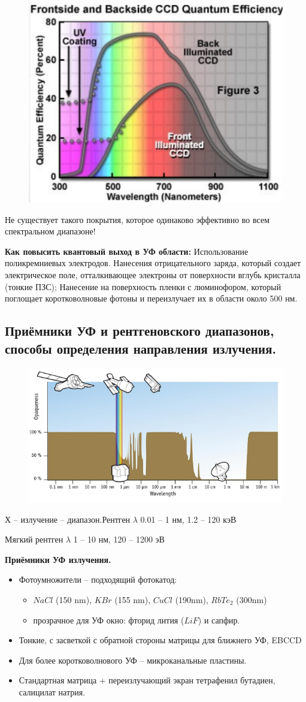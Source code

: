 \documentclass[12pt]{article}
\begin{document}
\begin{figure}[h]
	\centering
	\includegraphics[width=0.3\linewidth]{"Снимок экрана от 2024-12-23 20-03-43"}
\end{figure}
Не существует такого покрытия, которое одинаково
эффективно во всем спектральном диапазоне!

\textbf{Как повысить квантовый выход в УФ области:}
Использование поликремниевых электродов.
Нанесения отрицательного заряда, который создает
электрическое поле, отталкивающее электроны от
поверхности вглубь кристалла (тонкие ПЗС);
Нанесение на поверхность пленки с люминофором,
который поглощает коротковолновые фотоны и
переизлучает их в области около 500 нм.
\subsection{Приёмники УФ и рентгеновского диапазонов, способы определения направления излучения.}
\begin{figure}[h]
	\centering
	\includegraphics[width=0.5\linewidth]{"Снимок экрана от 2024-12-23 20-10-40"}
\end{figure}

Х – излучение – диапазон.Рентген $\lambda$ 0.01 – 1 нм, 1.2 – 120 кэВ

Мягкий рентген $\lambda$ 1 – 10 нм, 120 – 1200 эВ


\textbf{Приёмники УФ излучения.}
\begin{itemize}
\item Фотоумножители – подходящий фотокатод:
 \begin{itemize}
 	\item $NaCl$ (150 nm), $KBr$ (155 nm), $CuCl$ (190nm), $RbTe_2$ (300nm)
 	\item прозрачное для УФ окно: фторид лития ($LiF$) и сапфир.
 \end{itemize}

\item Тонкие, с засветкой с обратной стороны матрицы для
ближнего УФ, EBCCD
\item Для более коротковолнового УФ – микроканальные пластины.
\item Стандартная матрица + переизлучающий экран тетрафенил
бутадиен, салицилат натрия.
\end{itemize}
\end{document}
